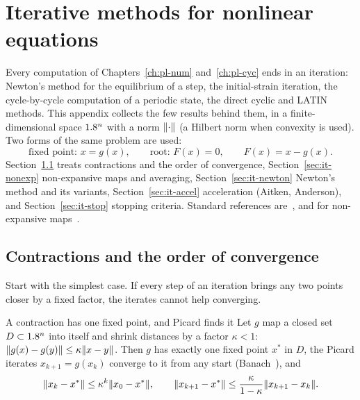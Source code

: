 \chapter{Iterative methods for nonlinear equations}\label{app:iter}

Every computation of Chapters~\ref{ch:pl-num} and~\ref{ch:pl-cyc} ends in an
iteration: Newton's method for the equilibrium of a step, the initial-strain
iteration, the cycle-by-cycle computation of a periodic state, the direct
cyclic and LATIN methods. This appendix collects the few results behind them,
in a finite-dimensional space $1.8^n$ with a norm $\lVert \cdot\rVert$ (a Hilbert norm
when convexity is used). Two forms of the same problem are used:
\begin{equation}\label{eq:it-forms}
  \text{fixed point: } x=g(x),\qquad\text{root: } F(x)=0,\qquad F(x)=x-g(x).
\end{equation}
Section~\ref{sec:it-contr} treats contractions and the order of convergence,
Section~\ref{sec:it-nonexp} non-expansive maps and averaging,
Section~\ref{sec:it-newton} Newton's method and its variants,
Section~\ref{sec:it-accel} acceleration (Aitken, Anderson), and
Section~\ref{sec:it-stop} stopping criteria. Standard references
are~\cite{OrtegaRheinboldt1970,Kelley1995,DennisSchnabel1983}, and for
non-expansive maps~\cite{BauschkeCombettes2017b}.

\section{Contractions and the order of convergence}\label{sec:it-contr}
%
Start with the simplest case. If every step of an iteration brings any two
points closer by a fixed factor, the iterates cannot help converging.
\begin{gbox}{A contraction has one fixed point, and Picard finds it}\label{thm:it-banach}
Let $g$ map a closed set $D\subset1.8^n$ into itself and shrink distances by a
factor $\kappa<1$: $\lVert g(x)-g(y)\rVert\le\kappa\lVert x-y\rVert$. Then $g$ has exactly one
fixed point $x^\ast$ in $D$, the Picard iterates $x_{k+1}=g(x_k)$ converge to it
from any start (Banach~\cite{Banach1922}), and
\begin{equation}\label{eq:it-banach}
  \lVert x_k-x^\ast\rVert\le\kappa^k\lVert x_0-x^\ast\rVert,\qquad
  \lVert x_{k+1}-x^\ast\rVert\le\frac{\kappa}{1-\kappa}\lVert x_{k+1}-x_k\rVert.
\end{equation}
\end{gbox}
